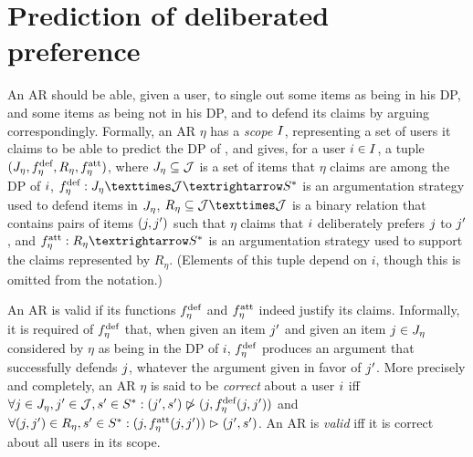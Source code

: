 \documentclass[version=3.21, pagesize, twoside=off, bibliography=totoc, DIV=calc, fontsize=12pt, a4paper, french, english]{scrartcl}
\begin{document}
\section{Prediction of deliberated preference}
\label{sec:pred}
An \ac{AR} should be able, given a user, to single out some items as being in his \ac{DP}, and some items as being not in his \ac{DP}, and to defend its claims by arguing correspondingly. 
Formally, an \ac{AR} $\eta$ has a \emph{scope} $I$, representing a set of users it claims to be able to predict the \ac{DP} of , and gives, for a  user $i \in I$, a tuple $(J_{\eta}, f^\text{def}_{\eta}, R_\eta, f^\text{att}_{\eta})$, where $J_{\eta} \subseteq \mathcal{J}$ is a set of items that $\eta$ claims are among the \ac{DP} of $i$, $\mdef: \mitems × \allitems → \allargs$ is an argumentation strategy  used to defend items in $J_{\eta}$, $R_\eta \subseteq \allitems × \allitems$ is a binary relation that contains pairs of items $(j, j')$ such that $\eta$ claims that $i$ deliberately prefers $j$ to $j'$, and $\matt: R_\eta → \allargs$ is an argumentation strategy used to support the claims represented by $R_\eta$. (Elements of this tuple depend on $i$, though this is omitted from the notation.) 

An \ac{AR} is valid if its functions $f^\text{def}_{\eta}$ and $f^\text{att}_{\eta}$ indeed justify its claims. Informally, it is required of $f^\text{def}_{\eta}$ that, when given an item $j'$ and given an item $j \in J_{\eta}$ considered by $\eta$ as being  in the \ac{DP} of $i$, $f^\text{def}_{\eta}$ produces an argument that successfully defends $j$, whatever the argument given in favor of $j'$. More precisely and completely, an \ac{AR} $\eta$ is said to be \emph{correct} about a user $i$ iff $\forall j \in J_{\eta}, j' \in \mathcal{J}, s' \in S^*: (j', s') \not\vartriangleright (j, f^\text{def}_{\eta}(j, j'))$ and $\forall (j, j') \in R_\eta, s' \in S^*: (j, f^\text{att}_{\eta}(j, j')) \vartriangleright (j', s')$. An \ac{AR} is \emph{valid} iff it is correct about all users in its scope. 
\end{document}
